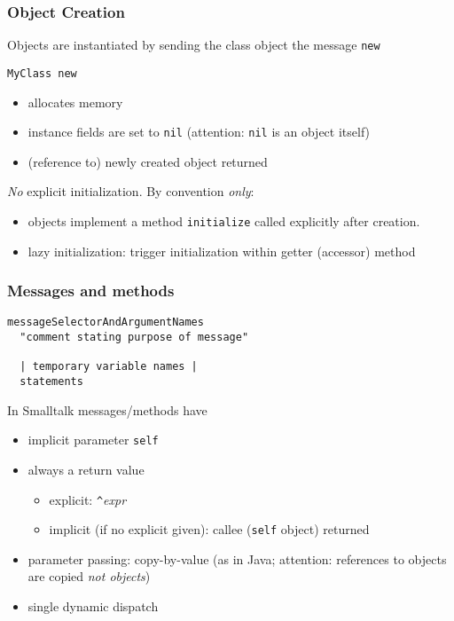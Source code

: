 \documentclass{beamer}
\begin{document}
\begin{frame}[fragile]
  \frametitle{Object Creation}

  Objects are instantiated by sending the class object the message \texttt{new}

\begin{lstlisting}[language=Smalltalk]
   MyClass new
\end{lstlisting}

\begin{itemize}
  \item allocates memory
  \item instance fields are set to \texttt{nil} (attention:
    \texttt{nil} is an object itself)
  \item (reference to) newly created object returned
\end{itemize}

\pause\bigskip

\emph{No} explicit initialization. By convention \emph{only}:
\begin{itemize}
  \item objects implement a method \texttt{initialize} called
    explicitly after creation.
  \item lazy initialization: trigger initialization within
    getter (accessor) method
\end{itemize}

\end{frame}


\begin{frame}[fragile]
\frametitle{Messages and methods}

\begin{lstlisting}[language=Smalltalk]
messageSelectorAndArgumentNames
  "comment stating purpose of message"

  | temporary variable names |
  statements
\end{lstlisting}

In Smalltalk messages/methods have
\begin{itemize}
  \item implicit parameter \texttt{self}
  \item always a return value
    \begin{itemize}
      \item explicit: \texttt{\^}\textit{expr}
      \item implicit (if no explicit given): callee (\texttt{self} object) returned
   \end{itemize}
 \item parameter passing: copy-by-value (as in Java; attention:
   references to objects are copied \emph{not objects})
 \item single dynamic dispatch
\end{itemize}

\end{frame}
\end{document}
